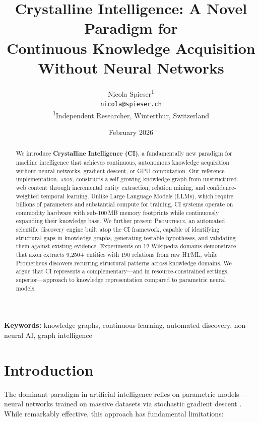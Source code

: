 \documentclass[11pt,twocolumn]{article}
\title{\textbf{Crystalline Intelligence: A Novel Paradigm for\\Continuous Knowledge Acquisition Without Neural Networks}}
\author{
  Nicola Spieser\textsuperscript{1}\\
  \texttt{nicola@spieser.ch}\\[6pt]
  \textsuperscript{1}Independent Researcher, Winterthur, Switzerland
}
\date{February 2026}
\begin{document}
\maketitle

\begin{abstract}
We introduce \textbf{Crystalline Intelligence (CI)}, a fundamentally new paradigm for machine intelligence that achieves continuous, autonomous knowledge acquisition without neural networks, gradient descent, or GPU computation. Our reference implementation, \textsc{axon}, constructs a self-growing knowledge graph from unstructured web content through incremental entity extraction, relation mining, and confidence-weighted temporal learning. Unlike Large Language Models (LLMs), which require billions of parameters and substantial compute for training, CI systems operate on commodity hardware with sub-100\,MB memory footprints while continuously expanding their knowledge base. We further present \textsc{Prometheus}, an automated scientific discovery engine built atop the CI framework, capable of identifying structural gaps in knowledge graphs, generating testable hypotheses, and validating them against existing evidence. Experiments on 12 Wikipedia domains demonstrate that axon extracts 9{,}250+ entities with 190 relations from raw HTML, while Prometheus discovers recurring structural patterns across knowledge domains. We argue that CI represents a complementary---and in resource-constrained settings, superior---approach to knowledge representation compared to parametric neural models.
\end{abstract}

\textbf{Keywords:} knowledge graphs, continuous learning, automated discovery, non-neural AI, graph intelligence

\section{Introduction}
\label{sec:intro}

The dominant paradigm in artificial intelligence relies on parametric models---neural networks trained on massive datasets via stochastic gradient descent \citep{lecun2015deep}. While remarkably effective, this approach has fundamental limitations:
\end{document}
